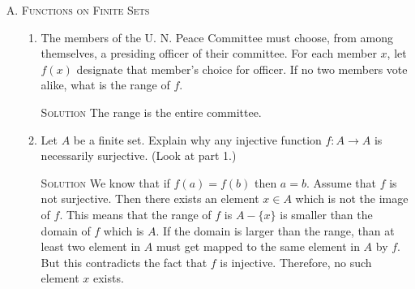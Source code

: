 \documentclass[twoside]{amsart}
\newcommand{\Reals}{\mathbb{R}{}}
\newcommand{\solution}{\textsc{Solution}\xspace}
\begin{document}
\begin{enumerate}[A.]
\begin{enumerate}[1]
      \solution $f^{-1}:\Reals\to\Reals$, where $f^{-1}(x)=\displaystyle
         \begin{cases}
	    x/2 & \text{if $x$ is rational}\\
	    x/3 & \text{if $x$ is irrational}
	 \end{cases}$
      
   \item $A = \{a,b,c,d\}$, $B=\{1,2,3,4\}$ and $f:A \to B$ is given by
   \[
       f = \begin{pmatrix}
              a & b & c & d \\
	      1 & 2 & 3 & 4
	   \end{pmatrix}
   \]

      \solution
      $f^{-1}:B \to A$ where $f^{-1}$ is given by
      \[
         f^{-1}(x) = \begin{pmatrix}
	                1 & 2 & 3 & 4\\
			a & b & c & d
		     \end{pmatrix}
     \]


   \item $G$ is a group, $a \in G$, and $f:G \to G$ is defined by
   $f(x)=ax$.

      \solution
      $f^{-1}:G \to G$ is defined by $f(x)=a^{-1}x$.
   \end{enumerate}

   \item \textsc{Functions on Finite Sets}
   \begin{enumerate}[1]
      \item The members of the U. N. Peace Committee must choose, from among
      themselves, a presiding officer of their committee. For each member
      $x$, let $f(x)$ designate that member's choice for officer. If no
      two members vote alike, what is the range of $f$.

      \solution The range is the entire committee.

      \item Let $A$ be a finite set. Explain why any injective function
      $f:A \to A$ is necessarily surjective. (Look at part 1.)

      \solution 
      We know that if $f(a)=f(b)$ then $a=b$. Assume that $f$
      is not surjective. Then there exists an element $x \in A$ which
      is not the image of $f$. This means that the range of $f$ is
      $A - \{x\}$ is smaller than the domain of $f$ which is $A$.
      If the domain is larger than the range, than at least two
      element in $A$ must get mapped to the same element in $A$ by $f$.
      But this contradicts the fact that $f$ is injective. Therefore,
      no such element $x$ exists.


\end{enumerate}
\end{enumerate}
\end{document}
